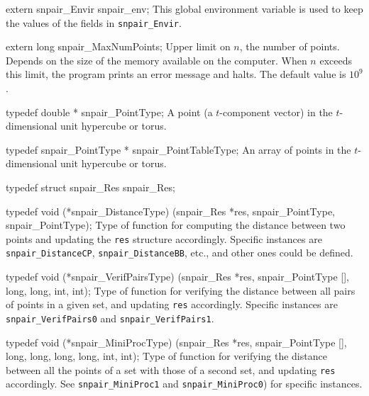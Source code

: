 extern snpair_Envir snpair_env;
\endcode
\tab
   This global environment variable is used to keep the values of the fields
   in {\tt snpair\_Envir}.
\endtab
\fi  %
\hide
\code


extern long snpair_MaxNumPoints;
\endcode
 \tab
  Upper limit on $n$, the number of points. Depends on the size of
  the memory available on  the computer.  When $n$ exceeds this limit,
  the program prints  an error message and halts.
  The default value is $10^{9}$.
 \endtab
\endhide

\ifdetailed  %


\code

typedef double * snpair_PointType;
\endcode
 \tab
  A point (a $t$-component vector) in the $t$-dimensional unit hypercube
  or torus.
 \endtab
\code


typedef snpair_PointType * snpair_PointTableType;
\endcode
 \tab An array of points in the $t$-dimensional unit hypercube or torus.
 \endtab
\fi
\hide %
\code


typedef struct snpair_Res snpair_Res;

typedef void (*snpair_DistanceType) (snpair_Res *res, snpair_PointType,
                                     snpair_PointType);
\endcode
 \tab  Type of function for computing the distance between two points
  and updating the {\tt res} structure accordingly.
  Specific instances are {\tt snpair\_DistanceCP},
  {\tt snpair\_DistanceBB}, etc., and other ones could be defined.
 \endtab
\code


typedef void (*snpair_VerifPairsType) (snpair_Res *res, snpair_PointType [],
                                       long, long, int, int);
\endcode
 \tab  Type of function for verifying the distance between all pairs
  of points in a given set, and updating {\tt res} accordingly.
  Specific instances are {\tt snpair\_VerifPairs0} and
  {\tt snpair\_VerifPairs1}.
 \endtab
\code


typedef void (*snpair_MiniProcType) (snpair_Res *res, snpair_PointType [],
                                     long, long, long, long, int, int);
\endcode
 \tab  Type of function for verifying the distance between all the
  points of a set with those of a second set, and updating {\tt res}
  accordingly.  See {\tt snpair\_MiniProc1} and {\tt snpair\_MiniProc0})
  for specific instances.
 \endtab
\endhide %

\ifdetailed  %
\code


